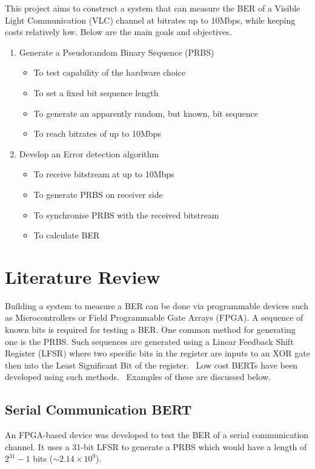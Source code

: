 \documentclass[12pt]{project_report}
\begin{document}
    This project aims to construct a system that can measure the BER of a Visible Light Communication (VLC) channel at bitrates up to 10Mbps, while keeping costs relatively low. Below are the main goals and objectives. 

    \begin{enumerate}
        \item Generate a Pseudorandom Binary Sequence (PRBS)
        \begin{itemize}
            \item To test capability of the hardware choice
            \item To set a fixed bit sequence length
            \item To generate an apparently random, but known, bit sequence
            \item To reach bitrates of up to 10Mbps
        \end{itemize}

        \item Develop an Error detection algorithm
        \begin{itemize}
            \item To receive bitstream at up to 10Mbps
            \item To generate PRBS on receiver side
            \item To synchronise PRBS with the received bitstream
            \item To calculate BER
        \end{itemize}
    \end{enumerate}

\clearpage
\section{Literature Review}
    Building a system to measure a BER can be done via  programmable devices such as Microcontrollers or Field Programmable Gate Arrays (FPGA).
    A sequence of known bits is required for testing a BER.\@
    One common method for generating one is the PRBS.\@
    Such sequences are generated using a Linear Feedback Shift Register (LFSR) where two specific bits in the register are inputs to an XOR gate then into the Least Significant Bit of the register.~\cite{DRiccardi2011,MGeorge2007}
    Low cost BERTs have been developed using such methods.~\cite{MJBasford2020, SChatterjee2023, NMarda2014}
    Examples of these are discussed below.

    \subsection{Serial Communication BERT}
        An FPGA-based device was developed to test the BER of a serial communication channel.
        It uses a 31-bit LFSR to generate a PRBS which would have a length of \begin{math}
            2^{31} - 1
        \end{math} bits ({$\sim$}\begin{math}
            2.14 \times 10^9
        \end{math}).~\cite{MJBasford2020,DRiccardi2011}
\end{document}
